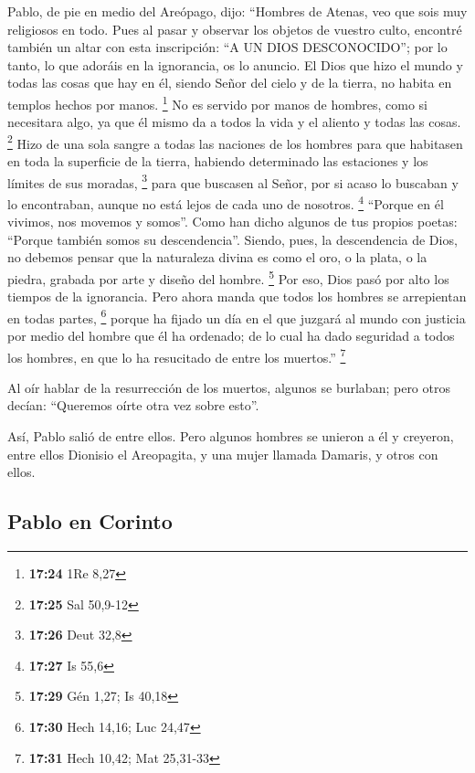  Pablo, de pie en medio del Areópago, dijo: ``Hombres de
Atenas, veo que sois muy religiosos en todo.  Pues al
pasar y observar los objetos de vuestro culto, encontré también un altar
con esta inscripción: ``A UN DIOS DESCONOCIDO''; por lo tanto, lo que
adoráis en la ignorancia, os lo anuncio.  El Dios que
hizo el mundo y todas las cosas que hay en él, siendo Señor del cielo y
de la tierra, no habita en templos hechos por manos. \footnote{\textbf{17:24}
  1Re 8,27}  No es servido por manos de hombres, como si
necesitara algo, ya que él mismo da a todos la vida y el aliento y todas
las cosas. \footnote{\textbf{17:25} Sal 50,9-12}  Hizo de
una sola sangre a todas las naciones de los hombres para que habitasen
en toda la superficie de la tierra, habiendo determinado las estaciones
y los límites de sus moradas, \footnote{\textbf{17:26} Deut 32,8}
 para que buscasen al Señor, por si acaso lo buscaban y
lo encontraban, aunque no está lejos de cada uno de nosotros.
\footnote{\textbf{17:27} Is 55,6}  ``Porque en él
vivimos, nos movemos y somos''. Como han dicho algunos de tus propios
poetas: ``Porque también somos su descendencia''. 
Siendo, pues, la descendencia de Dios, no debemos pensar que la
naturaleza divina es como el oro, o la plata, o la piedra, grabada por
arte y diseño del hombre. \footnote{\textbf{17:29} Gén 1,27; Is 40,18}
 Por eso, Dios pasó por alto los tiempos de la
ignorancia. Pero ahora manda que todos los hombres se arrepientan en
todas partes, \footnote{\textbf{17:30} Hech 14,16; Luc 24,47}
 porque ha fijado un día en el que juzgará al mundo con
justicia por medio del hombre que él ha ordenado; de lo cual ha dado
seguridad a todos los hombres, en que lo ha resucitado de entre los
muertos.'' \footnote{\textbf{17:31} Hech 10,42; Mat 25,31-33}

 Al oír hablar de la resurrección de los muertos, algunos
se burlaban; pero otros decían: ``Queremos oírte otra vez sobre esto''.

 Así, Pablo salió de entre ellos.  Pero
algunos hombres se unieron a él y creyeron, entre ellos Dionisio el
Areopagita, y una mujer llamada Damaris, y otros con ellos.

\hypertarget{pablo-en-corinto}{%
\subsection{Pablo en Corinto}\label{pablo-en-corinto}}

